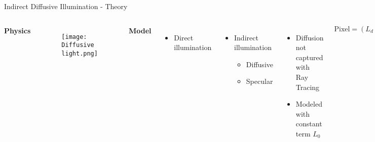 
    \begin{frame}{Indirect Diffusive Illumination - Theory}
        \begin{columns}[T]
            \textbf{Physics}
            \begin{figure}
                \centering
                \texttt{[image: Diffusive light.png]}
            \end{figure}
            
            \textbf{Model}

            \pause
            \begin{columns}[T]
                \begin{itemize}
                    \item Direct illumination
                \end{itemize}

                \begin{itemize}
                    \item Indirect illumination
                    \begin{itemize}
                        \pause
                        \item Diffusive
                        \item Specular
                    \end{itemize}
                \end{itemize}
            \end{columns}

            \pause
            \begin{itemize}
                \item Diffusion not captured with Ray Tracing
                \pause
                \item Modeled with constant term $L_0$
            \end{itemize}            

            \vspace{0.2cm}

            \pause
            \begin{equation*}
                \text{Pixel} = (L_d + L_0) \cdot \text{Color}
            \end{equation*}
        \end{columns}
    \end{frame}

